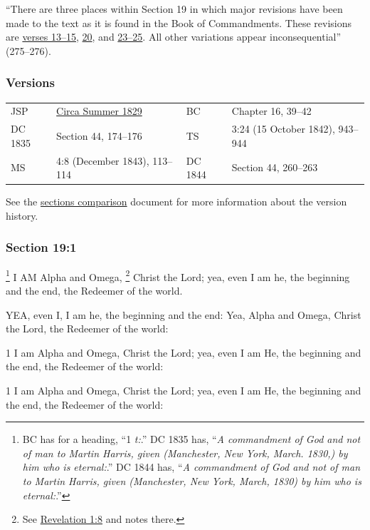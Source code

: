 			``There are three places within Section 19 in which major revisions have been made to the text as it is found in the Book of Commandments. These revisions are \hyperref[DC19-13]{verses 13--15}, \hyperref[DC19-20]{20}, and \hyperref[DC19-23]{23--25}. All other variations appear inconsequential'' (275--276).
			
	\subsubsection{Versions}
		\label{DC19-V}
	
		\begin{tabular}{p{1in}p{2in}p{1in}p{2in}}
			JSP		& \hyperref[EMS-1828-1829-JS-CIR-SUM-1829]{Circa Summer 1829}	& BC & Chapter 16, 39--42 \\
			DC 1835	& Section 44, 174--176											& TS & 3:24 (15 October 1842), 943--944 \\
			MS		& 4:8 (December 1843), 113--114									& DC 1844 & Section 44, 260--263 \\
		\end{tabular}
		
		\medskip
		
		See the \href{https://drive.google.com/file/d/1goAvNz8jS4R8slYfMG_db55Ty2z_vmgK/view?usp=sharing}{sections comparison} document for more information about the version history.

	\subsubsection{Section 19:1} %
		\label{DC19-1}

			\footnote{%
				BC has for a heading, ``1 \textit{t:}.'' DC 1835 has, ``\textit{A commandment of God and not of man to Martin Harris, given (Manchester, New York, March. 1830,) by him who is eternal:}.'' DC 1844 has, ``\textit{A commandment of God and not of man to Martin Harris, given (Manchester, New York, March, 1830) by him who is eternal:}.''
				}%
		I AM Alpha and Omega,%
			\footnote{%
				See \hyperref[REVELATIONNT-1-8]{Revelation 1:8} and notes there.
				}
		Christ the Lord; yea, even I am he, the beginning and the end, the Redeemer of the world.

		\begin{framed}
		\scriptsize
			\begin{compactdesc}
				\item[JSP] YEA, even I, I am he, the beginning and the end: Yea, Alpha and Omega, Christ the Lord, the Redeemer of the world:
				\item[RB1] [\textit{missing}]
				\item[DC 1835] 1 I am Alpha and Omega, Christ the Lord; yea, even I am He, the beginning and the end, the Redeemer of the world: 
				\item[DC 1844] 1 I am Alpha and Omega, Christ the Lord; yea, even I am He, the beginning and the end, the Redeemer of the world: 
			\end{compactdesc}
		\end{framed}

